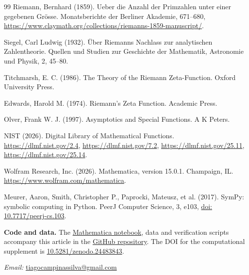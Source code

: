 \documentclass[11pt,a4paper]{article}
\begin{document}
\begin{thebibliography}{99}
 Riemann, Bernhard (1859). Ueber die Anzahl der Primzahlen unter einer gegebenen Grösse. Monatsberichte der Berliner Akademie, 671--680, \url{https://www.claymath.org/collections/riemanns-1859-manuscript/}.

 Siegel, Carl Ludwig (1932). Über Riemanns Nachlass zur analytischen Zahlentheorie. Quellen und Studien zur Geschichte der Mathematik, Astronomie und Physik, 2, 45--80.

 Titchmarsh, E. C. (1986). The Theory of the Riemann Zeta-Function. Oxford University Press.

 Edwards, Harold M. (1974). Riemann's Zeta Function. Academic Press.

 Olver, Frank W. J. (1997). Asymptotics and Special Functions. A K Peters.

 NIST (2026). Digital Library of Mathematical Functions. \url{https://dlmf.nist.gov/2.4}, \url{https://dlmf.nist.gov/7.2}, \url{https://dlmf.nist.gov/25.11}, \url{https://dlmf.nist.gov/25.14}.

 Wolfram Research, Inc. (2026). Mathematica, version 15.0.1. Champaign, IL. \url{https://www.wolfram.com/mathematica}.

 Meurer, Aaron, Smith, Christopher P., Paprocki, Mateusz, et al. (2017). SymPy: symbolic computing in Python. PeerJ Computer Science, 3, e103, \href{https://doi.org/10.7717/peerj-cs.103}{doi: 10.7717/peerj-cs.103}.
\end{thebibliography}

\medskip
{\small\noindent\textbf{Code and data.} The \href{https://github.com/tiagocampinasilva/alternating-hurwitz-zeta/blob/v1.0.0/Reproduce.nb}{Mathematica notebook}, data and verification scripts accompany this article in the \href{https://github.com/tiagocampinasilva/alternating-hurwitz-zeta}{GitHub repository}. The DOI for the computational supplement is \href{https://doi.org/10.5281/zenodo.24483843}{10.5281/zenodo.24483843}.\par}

\medskip
{\small\noindent\textit{Email:} \href{mailto:tiagocampinassilva@gmail.com}{tiagocampinassilva@gmail.com}\par}
\end{document}
